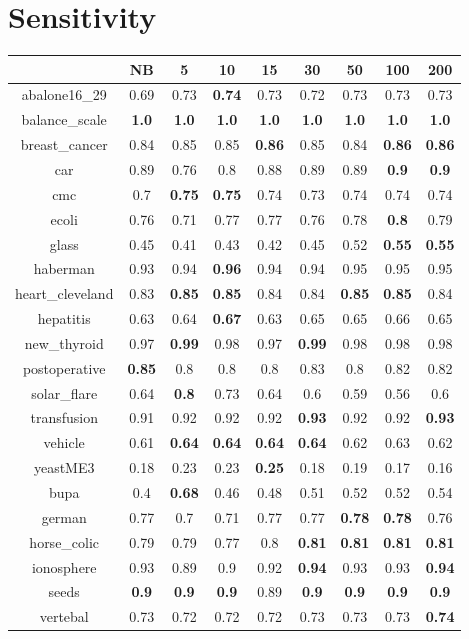 \documentclass{article}%
\begin{document}
%
\section*{Sensitivity}%
\begin{tabular}{c|cccccccc}%
\hline%
&NB&5&10&15&30&50&100&200\\%
\hline%
abalone16\_29&0.69&0.73&\textbf{0.74}&0.73&0.72&0.73&0.73&0.73\\%
\hline%
balance\_scale&\textbf{1.0}&\textbf{1.0}&\textbf{1.0}&\textbf{1.0}&\textbf{1.0}&\textbf{1.0}&\textbf{1.0}&\textbf{1.0}\\%
\hline%
breast\_cancer&0.84&0.85&0.85&\textbf{0.86}&0.85&0.84&\textbf{0.86}&\textbf{0.86}\\%
\hline%
car&0.89&0.76&0.8&0.88&0.89&0.89&\textbf{0.9}&\textbf{0.9}\\%
\hline%
cmc&0.7&\textbf{0.75}&\textbf{0.75}&0.74&0.73&0.74&0.74&0.74\\%
\hline%
ecoli&0.76&0.71&0.77&0.77&0.76&0.78&\textbf{0.8}&0.79\\%
\hline%
glass&0.45&0.41&0.43&0.42&0.45&0.52&\textbf{0.55}&\textbf{0.55}\\%
\hline%
haberman&0.93&0.94&\textbf{0.96}&0.94&0.94&0.95&0.95&0.95\\%
\hline%
heart\_cleveland&0.83&\textbf{0.85}&\textbf{0.85}&0.84&0.84&\textbf{0.85}&\textbf{0.85}&0.84\\%
\hline%
hepatitis&0.63&0.64&\textbf{0.67}&0.63&0.65&0.65&0.66&0.65\\%
\hline%
new\_thyroid&0.97&\textbf{0.99}&0.98&0.97&\textbf{0.99}&0.98&0.98&0.98\\%
\hline%
postoperative&\textbf{0.85}&0.8&0.8&0.8&0.83&0.8&0.82&0.82\\%
\hline%
solar\_flare&0.64&\textbf{0.8}&0.73&0.64&0.6&0.59&0.56&0.6\\%
\hline%
transfusion&0.91&0.92&0.92&0.92&\textbf{0.93}&0.92&0.92&\textbf{0.93}\\%
\hline%
vehicle&0.61&\textbf{0.64}&\textbf{0.64}&\textbf{0.64}&\textbf{0.64}&0.62&0.63&0.62\\%
\hline%
yeastME3&0.18&0.23&0.23&\textbf{0.25}&0.18&0.19&0.17&0.16\\%
\hline%
bupa&0.4&\textbf{0.68}&0.46&0.48&0.51&0.52&0.52&0.54\\%
\hline%
german&0.77&0.7&0.71&0.77&0.77&\textbf{0.78}&\textbf{0.78}&0.76\\%
\hline%
horse\_colic&0.79&0.79&0.77&0.8&\textbf{0.81}&\textbf{0.81}&\textbf{0.81}&\textbf{0.81}\\%
\hline%
ionosphere&0.93&0.89&0.9&0.92&\textbf{0.94}&0.93&0.93&\textbf{0.94}\\%
\hline%
seeds&\textbf{0.9}&\textbf{0.9}&\textbf{0.9}&0.89&\textbf{0.9}&\textbf{0.9}&\textbf{0.9}&\textbf{0.9}\\%
\hline%
vertebal&0.73&0.72&0.72&0.72&0.73&0.73&0.73&\textbf{0.74}\\%
\hline%
\end{tabular}
\end{document}
